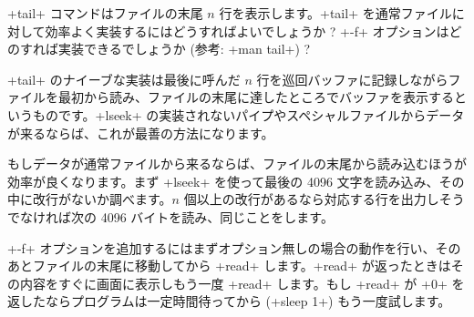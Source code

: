 \begin{exercise}
\ml+tail+ コマンドはファイルの末尾 $n$ 行を表示します。\ml+tail+ を通常ファイルに対して効率よく実装するにはどうすればよいでしょうか ? \ml+-f+ オプションはどのすれば実装できるでしょうか (参考: \ml+man tail+) ?
\enlargethispage{3\baselineskip} %
\end{exercise}
\begin{answer}
\ml+tail+ のナイーブな実装は最後に呼んだ $n$ 行を巡回バッファに記録しながらファイルを最初から読み、ファイルの末尾に達したところでバッファを表示するというものです。\ml+lseek+ の実装されないパイプやスペシャルファイルからデータが来るならば、これが最善の方法になります。

もしデータが通常ファイルから来るならば、ファイルの末尾から読み込むほうが効率が良くなります。まず \ml+lseek+ を使って最後の 4096 文字を読み込み、その中に改行がないか調べます。$n$ 個以上の改行があるなら対応する行を出力しそうでなければ次の 4096 バイトを読み、同じことをします。

\ml+-f+ オプションを追加するにはまずオプション無しの場合の動作を行い、そのあとファイルの末尾に移動してから \ml+read+ します。\ml+read+ が返ったときはその内容をすぐに画面に表示しもう一度 \ml+read+ します。もし \ml+read+ が \ml+0+ を返したならプログラムは一定時間待ってから (\ml+sleep 1+) もう一度試します。
\end{answer}

